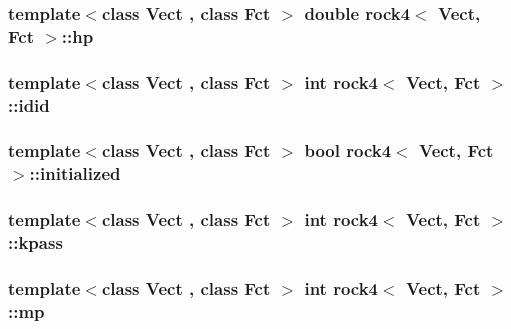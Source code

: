\hypertarget{classrock4_aa0803ba0a5d755f9173ef4cebb3c030f}{
\subsubsection[{hp}]{\setlength{\rightskip}{0pt plus 5cm}template$<$class Vect , class Fct $>$ double {\bf rock4}$<$ Vect, Fct $>$\-::hp\hspace{0.3cm}{\ttfamily [private]}}}\label{classrock4_aa0803ba0a5d755f9173ef4cebb3c030f}
\hypertarget{classrock4_a4a87f140af96e4d7821b5bc4a0667c0d}{
\subsubsection[{idid}]{\setlength{\rightskip}{0pt plus 5cm}template$<$class Vect , class Fct $>$ int {\bf rock4}$<$ Vect, Fct $>$\-::idid\hspace{0.3cm}{\ttfamily [private]}}}\label{classrock4_a4a87f140af96e4d7821b5bc4a0667c0d}
\hypertarget{classrock4_a3ddb06125afe0c3588f8c4d9e6c6b1a8}{
\subsubsection[{initialized}]{\setlength{\rightskip}{0pt plus 5cm}template$<$class Vect , class Fct $>$ bool {\bf rock4}$<$ Vect, Fct $>$\-::initialized\hspace{0.3cm}{\ttfamily [private]}}}\label{classrock4_a3ddb06125afe0c3588f8c4d9e6c6b1a8}
\hypertarget{classrock4_aa3a2a05c92f9b2ef019fb1e373a3020c}{
\subsubsection[{kpass}]{\setlength{\rightskip}{0pt plus 5cm}template$<$class Vect , class Fct $>$ int {\bf rock4}$<$ Vect, Fct $>$\-::kpass\hspace{0.3cm}{\ttfamily [private]}}}\label{classrock4_aa3a2a05c92f9b2ef019fb1e373a3020c}
\hypertarget{classrock4_ad895cc974b075c19b211f0d4d87d84e6}{
\subsubsection[{mp}]{\setlength{\rightskip}{0pt plus 5cm}template$<$class Vect , class Fct $>$ int {\bf rock4}$<$ Vect, Fct $>$\-::mp\hspace{0.3cm}{\ttfamily [private]}}}\label{classrock4_ad895cc974b075c19b211f0d4d87d84e6}
